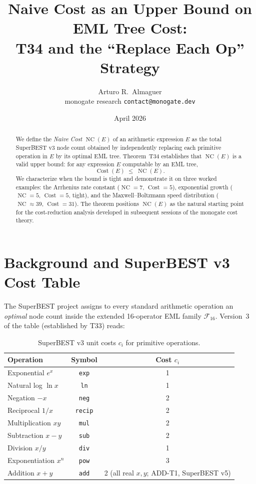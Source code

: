 \documentclass[12pt,a4paper]{article}
\title{Naive Cost as an Upper Bound on EML Tree Cost:\\
       T34 and the ``Replace Each Op'' Strategy}
\author{Arturo R.\ Almaguer\\
\small monogate research \quad \texttt{contact@monogate.dev}}
\date{April 2026}
\theoremstyle{definition}
\newcommand{\NC}{\operatorname{NC}}
\newcommand{\Cost}{\operatorname{Cost}}
\begin{document}
\maketitle

\begin{abstract}
We define the \emph{Naive Cost} $\NC(E)$ of an arithmetic expression $E$ as
the total SuperBEST v3 node count obtained by independently replacing each
primitive operation in $E$ by its optimal EML tree.
Theorem~T34 establishes that $\NC(E)$ is a valid upper bound: for any
expression $E$ computable by an EML tree,
\[
  \Cost(E) \;\leq\; \NC(E).
\]
We characterize when the bound is tight and demonstrate it on three worked
examples: the Arrhenius rate constant ($\NC=7$, $\Cost=5$), exponential
growth ($\NC=5$, $\Cost=5$, tight), and the Maxwell--Boltzmann speed
distribution ($\NC\approx 39$, $\Cost=31$).
The theorem positions $\NC(E)$ as the natural starting point for the
cost-reduction analysis developed in subsequent sessions of the
monogate cost theory.
\end{abstract}

\tableofcontents
\bigskip

\section{Background and SuperBEST v3 Cost Table}
\label{sec:background}

The SuperBEST project assigns to every standard arithmetic operation
an \emph{optimal} node count inside the extended 16-operator EML family
$\mathcal{F}_{16}$.
Version~3 of the table (established by T33) reads:

\begin{table}[h]
\centering
\caption{SuperBEST v3 unit costs $c_i$ for primitive operations.}
\label{tab:superbest3}
\smallskip
\begin{tabular}{@{}lcc@{}}
\toprule
\textbf{Operation} & \textbf{Symbol} & \textbf{Cost $c_i$} \\
\midrule
Exponential  $e^x$   & \texttt{exp} & 1 \\
Natural log  $\ln x$ & \texttt{ln}  & 1 \\
Negation     $-x$    & \texttt{neg} & 2 \\
Reciprocal   $1/x$   & \texttt{recip} & 2 \\
Multiplication $xy$  & \texttt{mul} & 2 \\
Subtraction  $x-y$   & \texttt{sub} & 2 \\
Division     $x/y$   & \texttt{div} & 1 \\
Exponentiation $x^n$ & \texttt{pow} & 3 \\
Addition     $x+y$   & \texttt{add} & 2 (all real $x,y$; ADD-T1, SuperBEST v5) \\
\bottomrule
\end{tabular}
\end{table}
\end{document}

